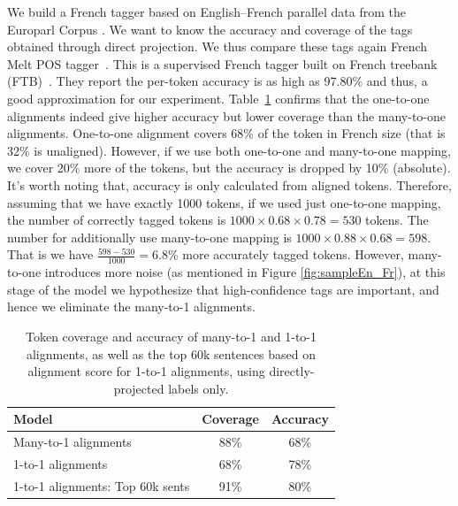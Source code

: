 We build a French tagger based on English--French parallel data from the Europarl Corpus \cite{europarl}. We want to know the accuracy and coverage of the tags obtained through direct projection. We thus compare these tags again French Melt POS tagger~\cite{DBLP:DenisS09}. This is a supervised French tagger built on French treebank (FTB)~\cite{ftb}. They report the per-token accuracy is as high as 97.80\% and thus, a good approximation for our experiment. Table~\ref{tab:coverageAndAccuracy} confirms
that the one-to-one alignments indeed give higher accuracy but lower
coverage than the many-to-one alignments. One-to-one alignment covers 68\% of the token in French size (that is 32\% is unaligned). However, if we use both one-to-one and many-to-one mapping, we cover 20\% more of the tokens, but the accuracy is dropped by 10\% (absolute). It's worth noting that, accuracy is only calculated from aligned tokens.  Therefore, assuming that we have exactly 1000 tokens, if we used just one-to-one mapping, the number of correctly tagged tokens is $1000 \times 0.68 \times 0.78 = 530$ tokens. The number for additionally use many-to-one mapping is $1000 \times 0.88 \times 0.68 = 598$. That is we have $\frac{598 - 530}{1000} = 6.8$\% more accurately tagged tokens. However, many-to-one introduces more noise (as mentioned in Figure \ref{fig:sampleEn_Fr}), at this stage of the model we hypothesize that high-confidence tags are important, and hence we eliminate the many-to-1 alignments.

\begin{table}
  \small
\tabcolsep 5pt
  \centering
    \begin{tabular}{lcc}
    \hline
	Model & Coverage & Accuracy\\
	\hline 
	Many-to-1 alignments & 88\%& 68\% \\
	1-to-1 alignments    & 68\% & 78\%\\
	1-to-1 alignments: Top 60k sents   & 91\% & 80\%\\
	\hline
    \end{tabular}
  \caption{Token coverage and accuracy of many-to-1 and 1-to-1
    alignments, as well as the top 60k sentences based on alignment
    score for 1-to-1 alignments, using directly-projected labels
    only.}
  \label{tab:coverageAndAccuracy}%
\end{table}%


